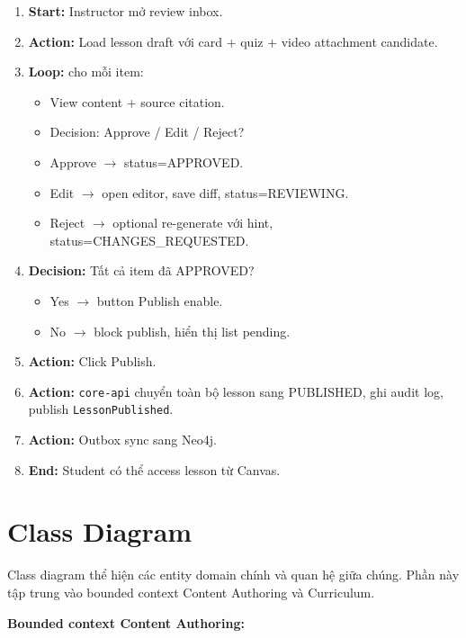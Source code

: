 \begin{enumerate}
    \item \textbf{Start:} Instructor mở review inbox.
    \item \textbf{Action:} Load lesson draft với card + quiz +
          video attachment candidate.
    \item \textbf{Loop:} cho mỗi item:
        \begin{itemize}
            \item View content + source citation.
            \item Decision: Approve / Edit / Reject?
            \item Approve $\to$ status=APPROVED.
            \item Edit $\to$ open editor, save diff, status=REVIEWING.
            \item Reject $\to$ optional re-generate với hint,
                  status=CHANGES\_REQUESTED.
        \end{itemize}
    \item \textbf{Decision:} Tất cả item đã APPROVED?
        \begin{itemize}
            \item Yes $\to$ button Publish enable.
            \item No $\to$ block publish, hiển thị list pending.
        \end{itemize}
    \item \textbf{Action:} Click Publish.
    \item \textbf{Action:} \texttt{core-api} chuyển toàn bộ lesson sang
          PUBLISHED, ghi audit log, publish \texttt{LessonPublished}.
    \item \textbf{Action:} Outbox sync sang Neo4j.
    \item \textbf{End:} Student có thể access lesson từ Canvas.
\end{enumerate}

\section{Class Diagram}

Class diagram thể hiện các entity domain chính và quan hệ giữa chúng. Phần
này tập trung vào bounded context Content Authoring và Curriculum.

\textbf{Bounded context Content Authoring:}

